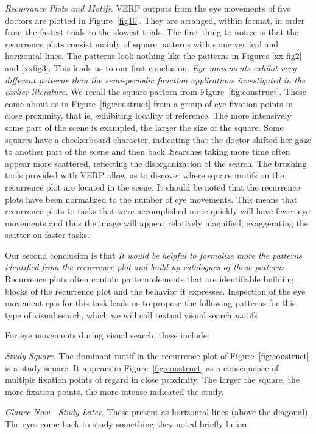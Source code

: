 \documentclass{sigchi}
\begin{document}
\emph{Recurrance Plots and Motifs}. VERP outputs from the eye movements of five doctors are
plotted in Figure~\ref{fig10}. They are arranged, within format, in order from the
fastest trials to the slowest trials. The first thing to notice is that the
recurrence plots consist mainly of square patterns with some vertical and horizontal lines. The patterns look nothing like the patterns in Figures [xx fig2] and [xxfig3]. This leads us to our first conclusion. \emph{Eye movements exhibit very different patterns than the semi-periodic function applications investigated in the earlier literature.} We recall the square
pattern from Figure~\ref{fig:construct}. These come about as in Figure~\ref{fig:construct} 
from a group of eye fixation points in close proximity, that is, exhibiting 
locality of reference. The more intensively some part of the scene is exampled, the
larger the size of the square. Some squares have a checkerboard character,
indicating that the doctor shifted her gaze to another part of the scene
and then back .Searches taking more time often  appear more
scattered, reflecting the disorganization of the search. The brushing 
tools provided with VERP allow us to discover where square motifs on 
the recurrence plot are located in the scene. It should be noted that the recurrence plots have been
normalized to the number of eye movements. This means that recurrence plots
to tasks that were accomplished more quickly will have fewer eye movements
and thus the image will appear relatively magnified, exaggerating the
scatter on faster tasks. 

Our second conclusion is that \emph{It would be helpful to formalize more the patterns identified from the recurrence plot and build up catalogues of these patterns.}
Recurrence plots often contain
pattern elements that are identifiable building blocks of the recurrence plot and the behavior it expresses. Inspection of the eye movement rp's for this task leads us to propose the following patterns for this type of visual search, which we will call textual visual search  {\emph motifs}

For eye
movements during visual search, these include:

\emph{Study Square.} The dominant motif in the recurrence plot of Figure~\ref{fig:construct} is a study square. It appears in  Figure~\ref{fig:construct} as a consequence of multiple fixation 
points of regard in close proximity. The larger the square, the 
more fixation points, the more intense indicated the study.

\emph{Glance Now—Study Later}. These present as horizontal lines (above the
diagonal). The eyes come back to study something they noted briefly before.
\end{document}
